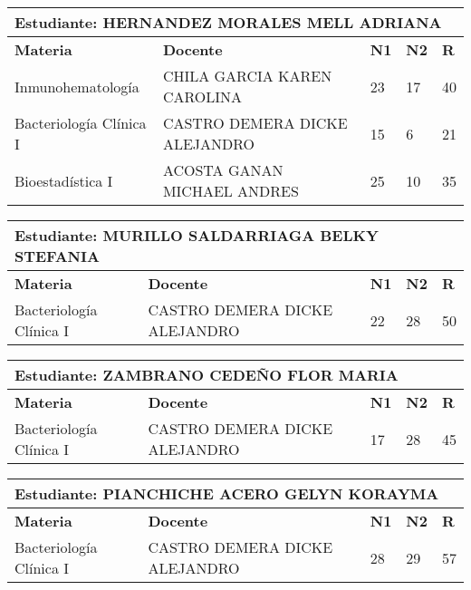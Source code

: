 \small
\begin{tabularx}{\textwidth}{|p{5cm}|p{7cm}|X|X|X|}
\hline
\multicolumn{5}{|p{\dimexpr\textwidth-2\tabcolsep-2\arrayrulewidth}|}{\textbf{Estudiante: HERNANDEZ MORALES MELL ADRIANA }}\\\hline
\textbf{Materia} & \textbf{Docente} & \textbf{N1} & \textbf{N2} & \textbf{R} \\ \hline
Inmunohematología & CHILA GARCIA KAREN CAROLINA  & 23 & 17& 40 \\ \hline
Bacteriología Clínica I & CASTRO DEMERA DICKE ALEJANDRO  & 15 & 6& 21 \\ \hline
Bioestadística I & ACOSTA GANAN MICHAEL ANDRES  & 25 & 10& 35 \\ \hline
\end{tabularx}\vspace{10mm}
\small
\begin{tabularx}{\textwidth}{|p{5cm}|p{7cm}|X|X|X|}
\hline
\multicolumn{5}{|p{\dimexpr\textwidth-2\tabcolsep-2\arrayrulewidth}|}{\textbf{Estudiante: MURILLO SALDARRIAGA BELKY STEFANIA }}\\\hline
\textbf{Materia} & \textbf{Docente} & \textbf{N1} & \textbf{N2} & \textbf{R} \\ \hline
Bacteriología Clínica I & CASTRO DEMERA DICKE ALEJANDRO  & 22 & 28& 50 \\ \hline
\end{tabularx}\vspace{10mm}
\small
\begin{tabularx}{\textwidth}{|p{5cm}|p{7cm}|X|X|X|}
\hline
\multicolumn{5}{|p{\dimexpr\textwidth-2\tabcolsep-2\arrayrulewidth}|}{\textbf{Estudiante: ZAMBRANO CEDEÑO FLOR MARIA }}\\\hline
\textbf{Materia} & \textbf{Docente} & \textbf{N1} & \textbf{N2} & \textbf{R} \\ \hline
Bacteriología Clínica I & CASTRO DEMERA DICKE ALEJANDRO  & 17 & 28& 45 \\ \hline
\end{tabularx}\vspace{10mm}
\small
\begin{tabularx}{\textwidth}{|p{5cm}|p{7cm}|X|X|X|}
\hline
\multicolumn{5}{|p{\dimexpr\textwidth-2\tabcolsep-2\arrayrulewidth}|}{\textbf{Estudiante: PIANCHICHE ACERO GELYN KORAYMA }}\\\hline
\textbf{Materia} & \textbf{Docente} & \textbf{N1} & \textbf{N2} & \textbf{R} \\ \hline
Bacteriología Clínica I & CASTRO DEMERA DICKE ALEJANDRO  & 28 & 29& 57 \\ \hline
\end{tabularx}\vspace{10mm}
